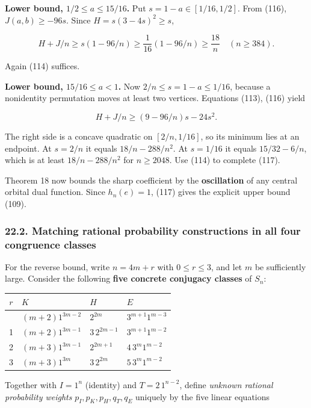 \documentclass[
  11pt,
]{article}
\begin{document}
\textbf{Lower bound, \(1/2\le a\le15/16\).} Put \(s=1-a\in[1/16,1/2]\).
From (116), \(J(a,b)\ge-96s\). Since \(H=s(3-4s)^2\ge s\),

\[
H+J/n\ge s(1-96/n)\ge\frac1{16}(1-96/n)
\ge\frac{18}{n}\quad(n\ge384).
\]

Again (114) suffices.

\textbf{Lower bound, \(15/16\le a<1\).} Now \(2/n\le s=1-a\le1/16\),
because a nonidentity permutation moves at least two vertices. Equations
(113), (116) yield

\[
H+J/n\ge
(9-96/n)s-24s^2.
\]

The right side is a concave quadratic on \([2/n,1/16]\), so its minimum
lies at an endpoint. At \(s=2/n\) it equals \(18/n-288/n^2\). At
\(s=1/16\) it equals \(15/32-6/n\), which is at least \(18/n-288/n^2\)
for \(n\ge2048\). Use (114) to complete (117).

Theorem 18 now bounds the sharp coefficient by the \textbf{oscillation}
of any central orbital dual function. Since \(h_n(e)=1\), (117) gives
the explicit upper bound (109).

\subsubsection{22.2. Matching rational probability constructions in all
four congruence
classes}\label{matching-rational-probability-constructions-in-all-four-congruence-classes}

For the reverse bound, write \(n=4m+r\) with \(0\le r\le3\), and let
\(m\) be sufficiently large. Consider the following \textbf{five
concrete conjugacy classes} of \(S_n\):

\begin{longtable}[]{@{}clll@{}}
\toprule\noalign{}
\(r\) & \(K\) & \(H\) & \(E\) \\
\midrule\noalign{}
\endhead
\bottomrule\noalign{}
\endlastfoot
0 & \((m+2)1^{3m-2}\) & \(2^{2m}\) & \(3^{m+1}1^{m-3}\) \\
1 & \((m+2)1^{3m-1}\) & \(3\,2^{2m-1}\) & \(3^{m+1}1^{m-2}\) \\
2 & \((m+3)1^{3m-1}\) & \(2^{2m+1}\) & \(4\,3^m1^{m-2}\) \\
3 & \((m+3)1^{3m}\) & \(3\,2^{2m}\) & \(5\,3^m1^{m-2}\) \\
\end{longtable}

Together with \(I=1^n\) (identity) and \(T=2\,1^{n-2}\), define
\emph{unknown rational probability weights} \(p_I,p_K,p_H,q_T,q_E\)
uniquely by the five linear equations
\end{document}
